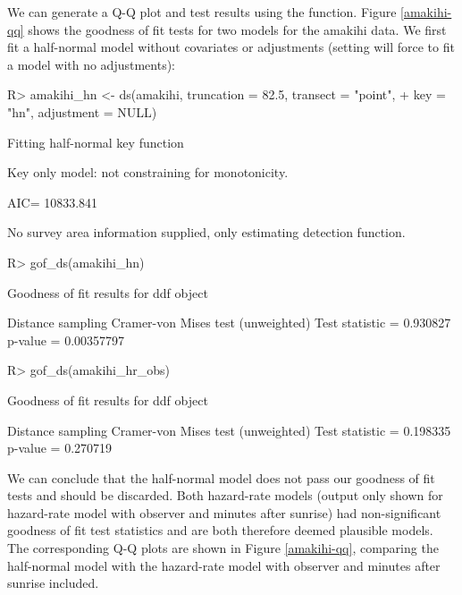 \documentclass[article]{jss}\usepackage[]{graphicx}\usepackage[]{color}
\begin{document}
We can generate a Q-Q plot and test results using the  function. Figure \ref{amakihi-qq} shows the goodness of fit tests for two models for the amakihi data. We first fit a half-normal model without covariates or adjustments (setting  will force  to fit a model with no adjustments):
\begin{Schunk}
\begin{Sinput}
R> amakihi_hn <- ds(amakihi, truncation = 82.5, transect = "point",
+                  key = "hn", adjustment = NULL)
\end{Sinput}
\begin{Soutput}
Fitting half-normal key function
\end{Soutput}
\begin{Soutput}
Key only model: not constraining for monotonicity.
\end{Soutput}
\begin{Soutput}
AIC= 10833.841
\end{Soutput}
\begin{Soutput}
No survey area information supplied, only estimating detection function.
\end{Soutput}
\begin{Sinput}
R> gof_ds(amakihi_hn)
\end{Sinput}
\begin{Soutput}

Goodness of fit results for ddf object

Distance sampling Cramer-von Mises test (unweighted)
Test statistic = 0.930827 p-value = 0.00357797
\end{Soutput}
\begin{Sinput}
R> gof_ds(amakihi_hr_obs)
\end{Sinput}
\begin{Soutput}

Goodness of fit results for ddf object

Distance sampling Cramer-von Mises test (unweighted)
Test statistic = 0.198335 p-value = 0.270719
\end{Soutput}
\end{Schunk}
We can conclude that the half-normal model does not pass our goodness of fit tests and should be discarded. Both hazard-rate models (output only shown for hazard-rate model with observer and minutes after sunrise) had non-significant goodness of fit test statistics and are both therefore deemed plausible models. The corresponding Q-Q plots are shown in Figure \ref{amakihi-qq}, comparing the half-normal model with the hazard-rate model with observer and minutes after sunrise included.
\end{document}
